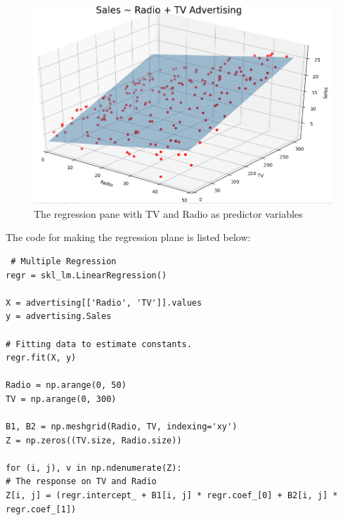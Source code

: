 \begin{figure}[H]
	\centering
	\includegraphics[width=\textwidth]{Img/Multi_reg_plane.PNG}
	\caption{The regression pane with TV and Radio as predictor variables}
	\label{fig:Multi_reg_plane}
\end{figure} 

The code for making the regression plane is listed below:

\begin{lstlisting}
 # Multiple Regression
regr = skl_lm.LinearRegression()

X = advertising[['Radio', 'TV']].values
y = advertising.Sales

# Fitting data to estimate constants.
regr.fit(X, y)

Radio = np.arange(0, 50)
TV = np.arange(0, 300)

B1, B2 = np.meshgrid(Radio, TV, indexing='xy')
Z = np.zeros((TV.size, Radio.size))

for (i, j), v in np.ndenumerate(Z):
# The response on TV and Radio
Z[i, j] = (regr.intercept_ + B1[i, j] * regr.coef_[0] + B2[i, j] * regr.coef_[1])
\end{lstlisting}


